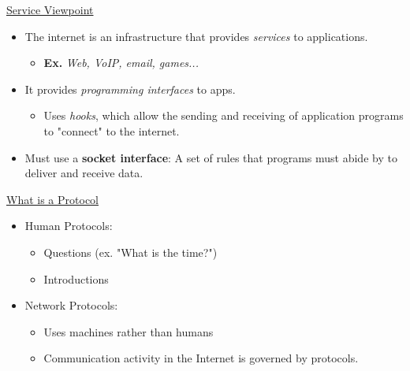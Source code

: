 \documentclass[11pt]{article}
\begin{document}
\underline{Service Viewpoint}

\begin{itemize}
\item The internet is an infrastructure that provides {\it services} to applications.
\begin{itemize}
\item {\bf Ex.} {\it Web, VoIP, email, games...}
\end{itemize}
\item It provides {\it programming interfaces} to apps.
\begin{itemize}
\item Uses {\it hooks}, which allow the sending and receiving of application programs to "connect" to the internet.
\end{itemize}
\item Must use a {\bf socket interface}: A set of rules that programs must abide by to deliver and receive data.
\end{itemize}

\newpage

\underline{What is a Protocol}

\begin{itemize}
\item Human Protocols:
\begin{itemize}
\item Questions (ex. "What is the time?")
\item Introductions
\end{itemize}
\item Network Protocols:
\begin{itemize}
\item Uses machines rather than humans
\item Communication activity in the Internet is governed by protocols.
\end{itemize}
\end{itemize}
\end{document}
